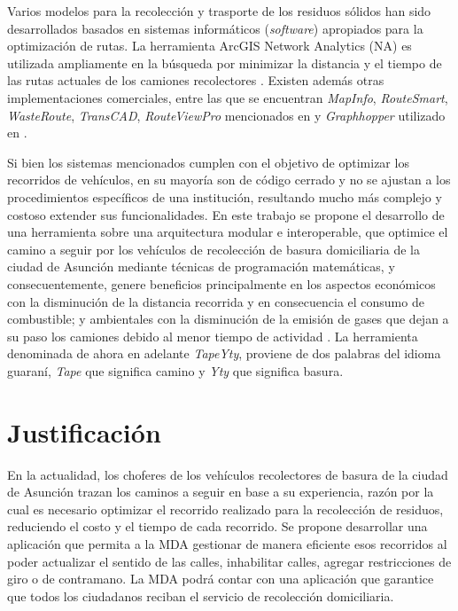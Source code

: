 
Varios modelos para la recolección y trasporte de los residuos sólidos han sido desarrollados basados en sistemas informáticos (\textit{software}) apropiados para la optimización de rutas. La herramienta ArcGIS Network Analytics (NA) es utilizada ampliamente en la búsqueda por minimizar la distancia y el tiempo de las rutas actuales de los camiones recolectores \citep{Kallel2016UsingTunisia,Malakahmad2014SolidMalaysia}. Existen además otras implementaciones comerciales, entre las que se encuentran \textit{MapInfo}, \textit{RouteSmart}, \textit{WasteRoute}, \textit{TransCAD}, \textit{RouteViewPro} mencionados en \citet{Kallel2016UsingTunisia} y \textit{Graphhopper} utilizado en \citet{Lozano2018SmartOptimization}.

Si bien los sistemas mencionados cumplen con el objetivo de optimizar los recorridos de vehículos, en su mayoría son de código cerrado y no se ajustan a los procedimientos específicos de una institución, resultando mucho más complejo y costoso extender sus funcionalidades. En este trabajo se propone el desarrollo de una herramienta sobre una arquitectura modular e interoperable, que optimice el camino a seguir por los vehículos de recolección de basura domiciliaria de la ciudad de Asunción mediante técnicas de programación matemáticas, y consecuentemente, genere beneficios principalmente en los aspectos económicos con la disminución de la distancia recorrida y en consecuencia el consumo de combustible; y ambientales con la disminución de la emisión de gases que dejan a su paso los camiones debido al menor tiempo de actividad \citep{Vu2018ParameterModel}. La herramienta denominada de ahora en adelante \textit{TapeYty}, proviene de dos palabras del idioma guaraní, \textit{Tape} que significa camino y \textit{Yty} que significa basura.

\section{Justificación}
 En la actualidad, los choferes de los vehículos recolectores de basura de la ciudad de Asunción trazan los caminos a seguir en base a su experiencia, razón por la cual es necesario optimizar el recorrido realizado para la recolección de residuos, reduciendo el costo y el tiempo de cada recorrido. Se propone desarrollar una aplicación que permita a la MDA gestionar de manera eficiente esos recorridos al poder actualizar el sentido de las calles, inhabilitar calles, agregar restricciones de giro o de contramano. La MDA podrá contar con una aplicación que garantice que todos los ciudadanos reciban el servicio de recolección domiciliaria.

